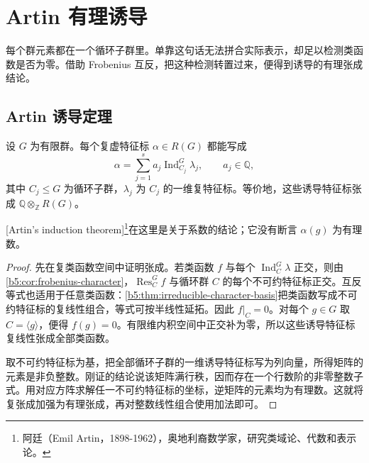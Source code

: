
\section{Artin 有理诱导}
\label{b5:sec:0502}

每个群元素都在一个循环子群里。单靠这句话无法拼合实际表示，却足以检测类函数是否为零。借助 Frobenius 互反，把这种检测转置过来，便得到诱导的有理张成结论。

\subsection{Artin 诱导定理}
\label{b5:subsec:0502:01}

\begin{theorem}\label{b5:thm:artin-induction}
	设 \(G\) 为有限群。每个复虚特征标 \(\alpha\in R(G)\) 都能写成
	\[
		\alpha=\sum_{j=1}^s a_j\operatorname{Ind}_{C_j}^G\lambda_j, \qquad a_j\in\mathbb Q,
	\]
	其中 \(C_j\le G\) 为循环子群，\(\lambda_j\) 为 \(C_j\) 的一维复特征标。等价地，这些诱导特征标张成 \(\mathbb Q\otimes_{\mathbb Z}R(G)\)。
\end{theorem}
[Artin's induction theorem]\footnote{阿廷（Emil Artin，1898-1962），奥地利裔数学家，研究类域论、代数和表示论。}在这里是关于系数的结论；它没有断言 \(\alpha(g)\) 为有理数。

\begin{proof}
	先在复类函数空间中证明张成。若类函数 \(f\) 与每个 \(\operatorname{Ind}_C^G\lambda\) 正交，则由\cref{b5:cor:frobenius-character}，\(\operatorname{Res}_C^Gf\) 与循环群 \(C\) 的每个不可约特征标正交。互反等式也适用于任意类函数：\cref{b5:thm:irreducible-character-basis}把类函数写成不可约特征标的复线性组合，等式可按半线性延拓。因此 \(f|_C=0\)。对每个 \(g\in G\) 取 \(C=\langle g\rangle\)，便得 \(f(g)=0\)。有限维内积空间中正交补为零，所以这些诱导特征标复线性张成全部类函数。

	取不可约特征标为基，把全部循环子群的一维诱导特征标写为列向量，所得矩阵的元素是非负整数。刚证的结论说该矩阵满行秩，因而存在一个行数阶的非零整数子式。用对应方阵求解任一不可约特征标的坐标，逆矩阵的元素均为有理数。这就将复张成加强为有理张成，再对整数线性组合使用加法即可。
\end{proof}

